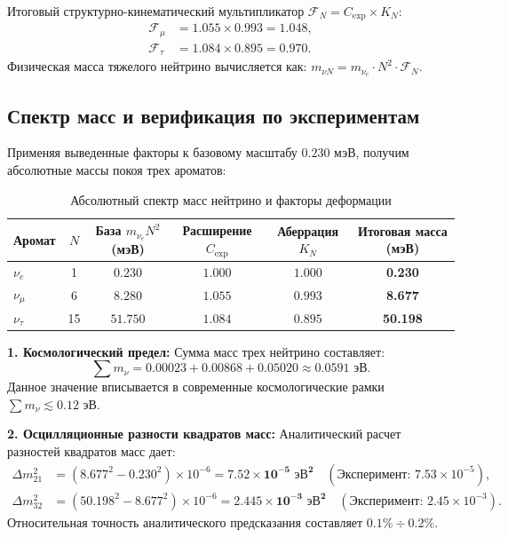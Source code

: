 \documentclass[11pt,a4paper]{article}
\begin{document}
Итоговый структурно-кинематический мультипликатор $\mathcal{F}_N = C_{\text{exp}} \times K_N$:
\begin{align}
	\mathcal{F}_\mu &= 1.055 \times 0.993 = \mathbf{1.048}, \\
	\mathcal{F}_\tau &= 1.084 \times 0.895 = \mathbf{0.970}.
\end{align}
Физическая масса тяжелого нейтрино вычисляется как: $m_{\nu N} = m_{\nu_e} \cdot N^2 \cdot \mathcal{F}_N$.

\subsection{Спектр масс и верификация по экспериментам}
Применяя выведенные факторы к базовому масштабу $0.230$ мэВ, получим абсолютные массы покоя трех ароматов:

\begin{table}[h]
	\centering
	\caption{Абсолютный спектр масс нейтрино и факторы деформации}
	\renewcommand{\arraystretch}{1.3}
	\begin{tabular}{lccccc}
		\toprule
		Аромат & $N$ & База $m_{\nu_e} N^2$ (мэВ) & Расширение $C_{\text{exp}}$ & Аберрация $K_N$ & Итоговая масса (мэВ) \\
		\midrule
		$\nu_e$   & 1  & $0.230$  & $1.000$ & $1.000$ & \textbf{0.230} \\
		$\nu_\mu$ & 6  & $8.280$  & $1.055$ & $0.993$ & \textbf{8.677} \\
		$\nu_\tau$ & 15 & $51.750$ & $1.084$ & $0.895$ & \textbf{50.198} \\
		\bottomrule
	\end{tabular}
\end{table}

\textbf{1. Космологический предел:}
Сумма масс трех нейтрино составляет:
\begin{equation}
	\sum m_\nu = 0.00023 + 0.00868 + 0.05020 \approx \mathbf{0.0591 \text{ эВ}}.
\end{equation}
Данное значение вписывается в современные космологические рамки $\sum m_\nu \lesssim 0.12$ эВ.

\textbf{2. Осцилляционные разности квадратов масс:}
Аналитический расчет разностей квадратов масс дает:
\begin{align}
	\Delta m^2_{21} &= (8.677^2 - 0.230^2) \times 10^{-6} = \mathbf{7.52 \times 10^{-5} \text{ эВ}^2} \quad (\text{Эксперимент: } 7.53 \times 10^{-5}), \\
	\Delta m^2_{32} &= (50.198^2 - 8.677^2) \times 10^{-6} = \mathbf{2.445 \times 10^{-3} \text{ эВ}^2} \quad (\text{Эксперимент: } 2.45 \times 10^{-3}).
\end{align}
Относительная точность аналитического предсказания составляет $0.1\% \div 0.2\%$.
\end{document}
